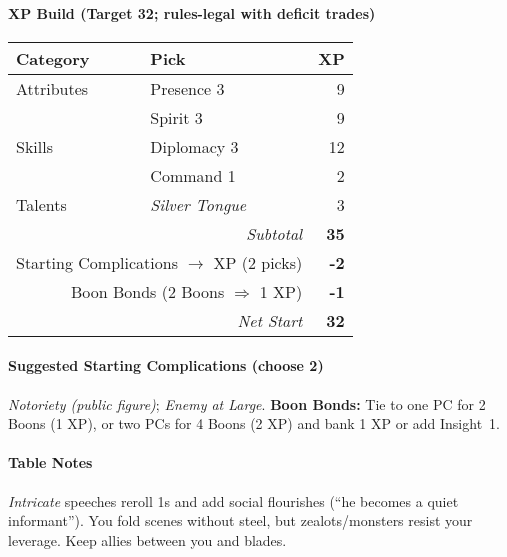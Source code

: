 \documentclass[11pt]{book}
\begin{document}
\paragraph{XP Build (Target 32; rules-legal with deficit trades)}
\begin{tabular}{@{}llr@{}}
\toprule
\textbf{Category} & \textbf{Pick} & \textbf{XP} \\
\midrule
Attributes & Presence 3 & 9 \\
           & Spirit 3 & 9 \\
Skills     & Diplomacy 3 & 12 \\
           & Command 1 & 2 \\
Talents    & \emph{Silver Tongue} & 3 \\
\midrule
\multicolumn{2}{r}{\textit{Subtotal}} & \textbf{35} \\
\multicolumn{2}{r}{Starting Complications $\rightarrow$ XP (2 picks)} & \textbf{-2} \\
\multicolumn{2}{r}{Boon Bonds (2 Boons $\Rightarrow$ 1 XP)} & \textbf{-1} \\
\midrule
\multicolumn{2}{r}{\textit{Net Start}} & \textbf{32} \\
\bottomrule
\end{tabular}

\paragraph{Suggested Starting Complications (choose 2)}
\emph{Notoriety (public figure)}; \emph{Enemy at Large}.  
\textbf{Boon Bonds:} Tie to one PC for 2 Boons (1 XP), or two PCs for 4 Boons (2 XP) and bank 1 XP or add Insight~1.

\paragraph{Table Notes}
\emph{Intricate} speeches reroll 1s and add social flourishes (“he becomes a quiet informant”). You fold scenes without steel, but zealots/monsters resist your leverage. Keep allies between you and blades.

\bigskip
\end{document}
